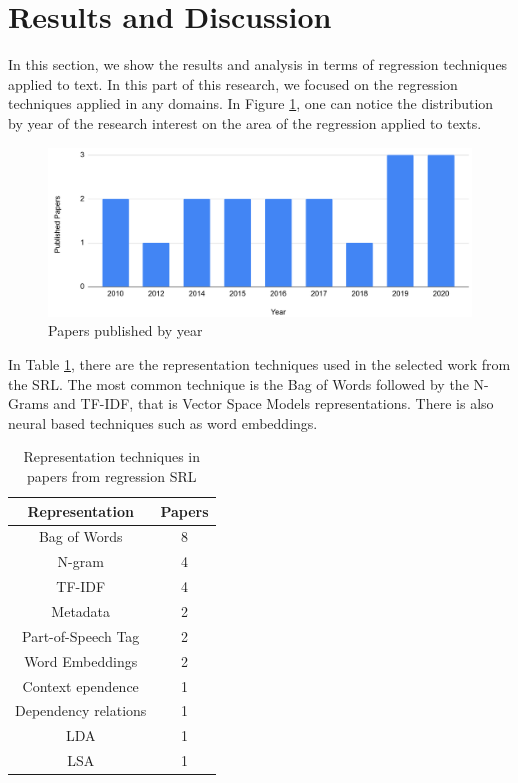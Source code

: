 \section{Results and Discussion}


In this section, we show the results and analysis in terms of regression techniques applied to text. In this part of this research, we focused on the regression techniques applied in any domains. In Figure \ref{fig:rsl_regression_year_publishing}, one can notice the distribution by year of the research interest on the area of the regression applied to texts.


\begin{figure}[htb]
    \centering
    \caption{Papers published by year}
    \label{fig:rsl_regression_year_publishing}
    \includegraphics[width=\textwidth]{images/appendix/rsl_regression.png}
\end{figure}


In Table \ref{tab:rsl_regression_representation}, there are the representation techniques used in the selected work from the SRL. The most common technique is the Bag of Words followed by the N-Grams and TF-IDF, that is Vector Space Models representations. There is also neural based techniques such as word embeddings.


\begin{table}[htb]
\centering
\caption{Representation techniques in papers from regression SRL}
\label{tab:rsl_regression_representation}
\footnotesize
\begin{tabular}{@{}cc@{}}
\toprule
\textbf{Representation} & \textbf{Papers} \\ \midrule
Bag of Words & 8 \\
N-gram & 4 \\
TF-IDF & 4 \\
Metadata & 2 \\
Part-of-Speech Tag & 2 \\
Word Embeddings & 2 \\
Context ependence & 1 \\
Dependency relations & 1 \\
LDA & 1 \\
LSA & 1 \\ \bottomrule
\end{tabular}
\end{table}


